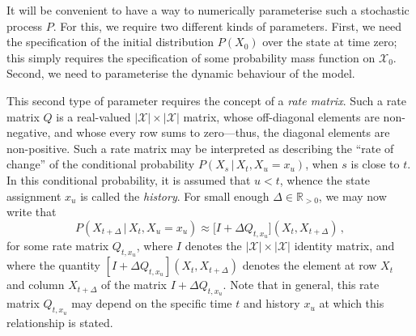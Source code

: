 \documentclass[twoside,11pt]{article}
\newcommand{\reals}{\mathbb{R}}
\newcommand{\realspos}{\reals_{>0}}
\newcommand{\realsnonneg}{\reals_{\geq 0}}
\newcommand{\states}{\mathcal{X}}
\begin{document}


It will be convenient to have a way to numerically parameterise such a stochastic process $P$. For this, we require two different kinds of parameters. First, we need the specification of the initial distribution $P(X_0)$ over the state at time zero; this simply requires the specification of some probability mass function on $\states_0$. Second, we need to parameterise the dynamic behaviour of the model.

This second type of parameter requires the concept of a \emph{rate matrix}. Such a rate matrix $Q$ is a real-valued $\lvert\states\rvert\times\lvert\states\rvert$ matrix, whose off-diagonal elements are non-negative, and whose every row sums to zero---thus, the diagonal elements are non-positive. Such a rate matrix may be interpreted as describing the ``rate of change'' of the conditional probability $P(X_s\,\vert\,X_t,X_u=x_u)$, when $s$ is close to $t$. In this conditional probability, it is assumed that $u<t$, whence the state assignment $x_u$ is called the \emph{history}. For small enough $\Delta\in\realspos$, we may now write that
\begin{equation*}
P(X_{t+\Delta}\,\vert\,X_t,X_u=x_u) \approx \bigl[I + \Delta Q_{t,x_u}\bigr](X_t, X_{t+\Delta})\,,
\end{equation*}
for some rate matrix $Q_{t,x_u}$, where $I$ denotes the $\lvert\states\rvert\times\lvert\states\rvert$ identity matrix, and where the quantity $[I + \Delta Q_{t,x_u}](X_t,X_{t+\Delta})$ denotes the element at row $X_t$ and column $X_{t+\Delta}$ of the matrix $I + \Delta Q_{t,x_u}$. Note that in general, this rate matrix $Q_{t,x_u}$ may depend on the specific time $t$ and history $x_u$ at which this relationship is stated. %
\end{document}
